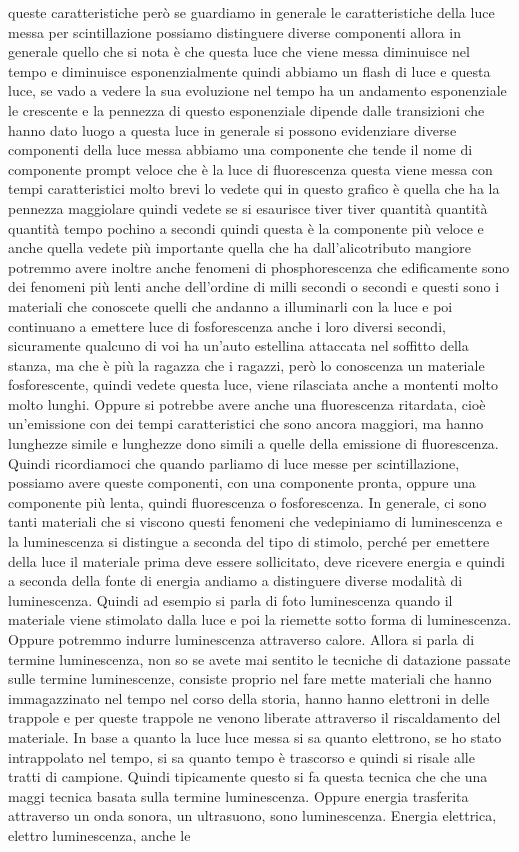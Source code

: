 {queste caratteristiche però se guardiamo in generale le caratteristiche della luce messa per scintillazione possiamo distinguere diverse componenti allora in generale quello che si nota è che questa luce che viene messa diminuisce nel tempo e diminuisce esponenzialmente quindi abbiamo un flash di luce e questa luce, se vado a vedere la sua evoluzione nel tempo ha un andamento esponenziale le crescente e la pennezza di questo esponenziale dipende dalle transizioni che hanno dato luogo a questa luce in generale si possono evidenziare diverse componenti della luce messa abbiamo una componente che tende il nome di componente prompt veloce che è la luce di fluorescenza questa viene messa con tempi caratteristici molto brevi lo vedete qui in questo grafico è quella che ha la pennezza maggiolare quindi vedete se si esaurisce tiver tiver quantità quantità quantità tempo pochino a secondi quindi questa è la componente più veloce e anche quella vedete più importante quella che ha dall'alicotributo mangiore potremmo avere inoltre anche fenomeni di phosphorescenza che edificamente sono dei fenomeni più lenti anche dell'ordine di milli secondi o secondi e questi sono i materiali che conoscete quelli che andanno a illuminarli con la luce e poi continuano a emettere luce di fosforescenza anche i loro diversi secondi, sicuramente qualcuno di voi ha un'auto estellina attaccata nel soffitto della stanza, ma che è più la ragazza che i ragazzi, però lo conoscenza un materiale fosforescente, quindi vedete questa luce, viene rilasciata anche a montenti molto molto lunghi. Oppure si potrebbe avere anche una fluorescenza ritardata, cioè un'emissione con dei tempi caratteristici che sono ancora maggiori, ma hanno lunghezze simile e lunghezze dono simili a quelle della emissione di fluorescenza. Quindi ricordiamoci che quando parliamo di luce messe per scintillazione, possiamo avere queste componenti, con una componente pronta, oppure una componente più lenta, quindi fluorescenza o fosforescenza. In generale, ci sono tanti materiali che si viscono questi fenomeni che vedepiniamo di luminescenza e la luminescenza si distingue a seconda del tipo di stimolo, perché per emettere della luce il materiale prima deve essere sollicitato, deve ricevere energia e quindi a seconda della fonte di energia andiamo a distinguere diverse modalità di luminescenza. Quindi ad esempio si parla di foto luminescenza quando il materiale viene stimolato dalla luce e poi la riemette sotto forma di luminescenza. Oppure potremmo indurre luminescenza attraverso calore. Allora si parla di termine luminescenza, non so se avete mai sentito le tecniche di datazione passate sulle termine luminescenze, consiste proprio nel fare mette materiali che hanno immagazzinato nel tempo nel corso della storia, hanno hanno elettroni in delle trappole e per queste trappole ne venono liberate attraverso il riscaldamento del materiale. In base a quanto la luce luce messa si sa quanto elettrono, se ho stato intrappolato nel tempo, si sa quanto tempo è trascorso e quindi si risale alle tratti di campione. Quindi tipicamente questo si fa questa tecnica che che una maggi tecnica basata sulla termine luminescenza. Oppure energia trasferita attraverso un onda sonora, un ultrasuono, sono luminescenza. Energia elettrica, elettro luminescenza, anche le }

